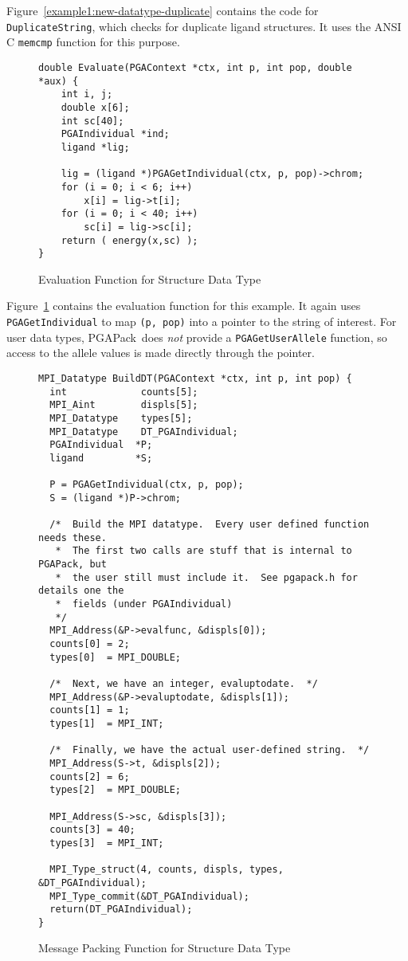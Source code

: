\documentclass{report}
\newcommand{\pga}{PGAPack}
\begin{document}
Figure~\ref{example1:new-datatype-duplicate} contains the code for {\tt
DuplicateString}, which checks for duplicate ligand structures.  It uses the
ANSI C {\tt memcmp} function for this purpose.

\begin{figure}
\begin{verbatim}
double Evaluate(PGAContext *ctx, int p, int pop, double *aux) {
    int i, j;
    double x[6];
    int sc[40];
    PGAIndividual *ind;
    ligand *lig;

    lig = (ligand *)PGAGetIndividual(ctx, p, pop)->chrom;
    for (i = 0; i < 6; i++)
        x[i] = lig->t[i];
    for (i = 0; i < 40; i++)
        sc[i] = lig->sc[i];
    return ( energy(x,sc) );
}
\end{verbatim}
\caption{Evaluation Function for Structure Data Type}
\label{example1:new-datatype-evaluate}
\end{figure}

Figure~\ref{example1:new-datatype-evaluate} contains the evaluation function
for this example.  It again uses {\tt PGAGetIndividual} to map {\tt (p, pop)}
into a pointer to the string of interest.  For user data types, \pga\ does
{\em not} provide a {\tt PGAGetUserAllele} function, so access to the allele
values is made directly through the pointer.

\begin{figure}
\begin{verbatim}
MPI_Datatype BuildDT(PGAContext *ctx, int p, int pop) {
  int             counts[5];
  MPI_Aint        displs[5];
  MPI_Datatype    types[5];
  MPI_Datatype    DT_PGAIndividual;
  PGAIndividual  *P;
  ligand         *S;

  P = PGAGetIndividual(ctx, p, pop);
  S = (ligand *)P->chrom;

  /*  Build the MPI datatype.  Every user defined function needs these.
   *  The first two calls are stuff that is internal to PGAPack, but 
   *  the user still must include it.  See pgapack.h for details one the
   *  fields (under PGAIndividual)
   */
  MPI_Address(&P->evalfunc, &displs[0]);
  counts[0] = 2;
  types[0]  = MPI_DOUBLE;

  /*  Next, we have an integer, evaluptodate.  */  
  MPI_Address(&P->evaluptodate, &displs[1]);
  counts[1] = 1;
  types[1]  = MPI_INT;

  /*  Finally, we have the actual user-defined string.  */
  MPI_Address(S->t, &displs[2]);
  counts[2] = 6;
  types[2]  = MPI_DOUBLE;

  MPI_Address(S->sc, &displs[3]);
  counts[3] = 40;
  types[3]  = MPI_INT;

  MPI_Type_struct(4, counts, displs, types, &DT_PGAIndividual);
  MPI_Type_commit(&DT_PGAIndividual);
  return(DT_PGAIndividual);
}
\end{verbatim}
\caption{Message Packing Function for Structure Data Type}
\label{example1:new-datatype-build}
\end{figure}
\end{document}
